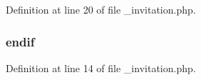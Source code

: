 Definition at line 20 of file \-\_\-invitation.\-php.

\hypertarget{__invitation_8php_a82cd33ca97ff99f2fcc5e9c81d65251b}{
\subsubsection[{endif}]{\setlength{\rightskip}{0pt plus 5cm}endif}}\label{__invitation_8php_a82cd33ca97ff99f2fcc5e9c81d65251b}


Definition at line 14 of file \-\_\-invitation.\-php.

